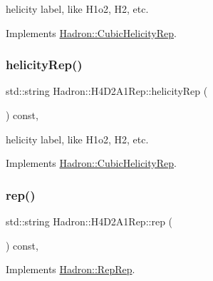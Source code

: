 helicity label, like H1o2, H2, etc. 

Implements \mbox{\hyperlink{structHadron_1_1CubicHelicityRep_af1096946b7470edf0a55451cc662f231}{Hadron\+::\+Cubic\+Helicity\+Rep}}.

\mbox{\label{structHadron_1_1H4D2A1Rep_a64d7b12a9ed77971c31f5ce36e3b22bc}} 
\subsubsection{\texorpdfstring{helicityRep()}{helicityRep()}\hspace{0.1cm}{\footnotesize\ttfamily [2/2]}}
{\footnotesize\ttfamily std\+::string Hadron\+::\+H4\+D2\+A1\+Rep\+::helicity\+Rep (\begin{DoxyParamCaption}{ }\end{DoxyParamCaption}) const\hspace{0.3cm}{\ttfamily [inline]}, {\ttfamily [virtual]}}

helicity label, like H1o2, H2, etc. 

Implements \mbox{\hyperlink{structHadron_1_1CubicHelicityRep_af1096946b7470edf0a55451cc662f231}{Hadron\+::\+Cubic\+Helicity\+Rep}}.

\mbox{\label{structHadron_1_1H4D2A1Rep_ad4b2ccfecdb8297fd88eaa27c9d1262e}} 
\subsubsection{\texorpdfstring{rep()}{rep()}\hspace{0.1cm}{\footnotesize\ttfamily [1/3]}}
{\footnotesize\ttfamily std\+::string Hadron\+::\+H4\+D2\+A1\+Rep\+::rep (\begin{DoxyParamCaption}{ }\end{DoxyParamCaption}) const\hspace{0.3cm}{\ttfamily [inline]}, {\ttfamily [virtual]}}



Implements \mbox{\hyperlink{structHadron_1_1RepRep_ab3213025f6de249f7095892109575fde}{Hadron\+::\+Rep\+Rep}}.

\mbox{\label{structHadron_1_1H4D2A1Rep_ad4b2ccfecdb8297fd88eaa27c9d1262e}} 
